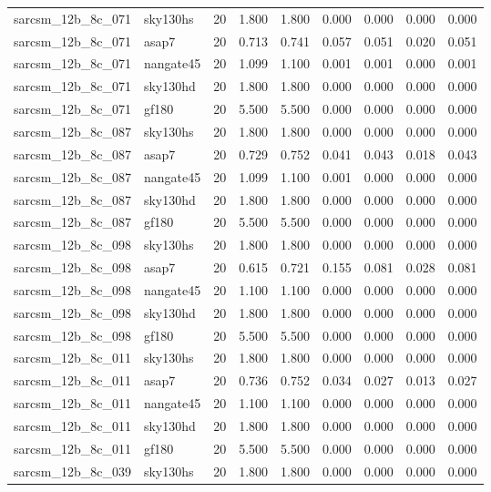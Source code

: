\begin{tabular}{llrrrrrrr}
sarcsm\_12b\_8c\_071 & sky130hs & 20 & 1.800 & 1.800 & 0.000 & 0.000 & 0.000 & 0.000 \\
sarcsm\_12b\_8c\_071 & asap7 & 20 & 0.713 & 0.741 & 0.057 & 0.051 & 0.020 & 0.051 \\
sarcsm\_12b\_8c\_071 & nangate45 & 20 & 1.099 & 1.100 & 0.001 & 0.001 & 0.000 & 0.001 \\
sarcsm\_12b\_8c\_071 & sky130hd & 20 & 1.800 & 1.800 & 0.000 & 0.000 & 0.000 & 0.000 \\
sarcsm\_12b\_8c\_071 & gf180 & 20 & 5.500 & 5.500 & 0.000 & 0.000 & 0.000 & 0.000 \\
sarcsm\_12b\_8c\_087 & sky130hs & 20 & 1.800 & 1.800 & 0.000 & 0.000 & 0.000 & 0.000 \\
sarcsm\_12b\_8c\_087 & asap7 & 20 & 0.729 & 0.752 & 0.041 & 0.043 & 0.018 & 0.043 \\
sarcsm\_12b\_8c\_087 & nangate45 & 20 & 1.099 & 1.100 & 0.001 & 0.000 & 0.000 & 0.000 \\
sarcsm\_12b\_8c\_087 & sky130hd & 20 & 1.800 & 1.800 & 0.000 & 0.000 & 0.000 & 0.000 \\
sarcsm\_12b\_8c\_087 & gf180 & 20 & 5.500 & 5.500 & 0.000 & 0.000 & 0.000 & 0.000 \\
sarcsm\_12b\_8c\_098 & sky130hs & 20 & 1.800 & 1.800 & 0.000 & 0.000 & 0.000 & 0.000 \\
sarcsm\_12b\_8c\_098 & asap7 & 20 & 0.615 & 0.721 & 0.155 & 0.081 & 0.028 & 0.081 \\
sarcsm\_12b\_8c\_098 & nangate45 & 20 & 1.100 & 1.100 & 0.000 & 0.000 & 0.000 & 0.000 \\
sarcsm\_12b\_8c\_098 & sky130hd & 20 & 1.800 & 1.800 & 0.000 & 0.000 & 0.000 & 0.000 \\
sarcsm\_12b\_8c\_098 & gf180 & 20 & 5.500 & 5.500 & 0.000 & 0.000 & 0.000 & 0.000 \\
sarcsm\_12b\_8c\_011 & sky130hs & 20 & 1.800 & 1.800 & 0.000 & 0.000 & 0.000 & 0.000 \\
sarcsm\_12b\_8c\_011 & asap7 & 20 & 0.736 & 0.752 & 0.034 & 0.027 & 0.013 & 0.027 \\
sarcsm\_12b\_8c\_011 & nangate45 & 20 & 1.100 & 1.100 & 0.000 & 0.000 & 0.000 & 0.000 \\
sarcsm\_12b\_8c\_011 & sky130hd & 20 & 1.800 & 1.800 & 0.000 & 0.000 & 0.000 & 0.000 \\
sarcsm\_12b\_8c\_011 & gf180 & 20 & 5.500 & 5.500 & 0.000 & 0.000 & 0.000 & 0.000 \\
sarcsm\_12b\_8c\_039 & sky130hs & 20 & 1.800 & 1.800 & 0.000 & 0.000 & 0.000 & 0.000 \\

\end{tabular}
